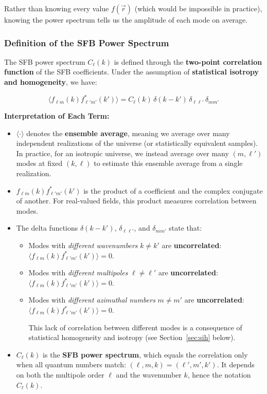 Rather than knowing every value $f(\vec{r})$ (which would be impossible in practice), knowing the power spectrum tells us the amplitude of each mode on average.

\subsubsection{Definition of the SFB Power Spectrum}

The SFB power spectrum $C_\ell(k)$ is defined through the \textbf{two-point correlation function} of the SFB coefficients. Under the assumption of \textbf{statistical isotropy and homogeneity}, we have:

\begin{equation}
\langle f_{\ell m}(k) f_{\ell' m'}^*(k') \rangle = C_\ell(k) \, \delta(k - k') \, \delta_{\ell \ell'} \, \delta_{m m'}
\label{eq:sfb_ps_definition}
\end{equation}

\textbf{Interpretation of Each Term:}

\begin{itemize}
    \item $\langle \cdot \rangle$ denotes the \textbf{ensemble average}, meaning we average over many independent realizations of the universe (or statistically equivalent samples). In practice, for an isotropic universe, we instead average over many $(m, \ell')$ modes at fixed $(k, \ell)$ to estimate this ensemble average from a single realization.
    
    \item $f_{\ell m}(k) f_{\ell' m'}^*(k')$ is the product of a coefficient and the complex conjugate of another. For real-valued fields, this product measures correlation between modes.
    
    \item The delta functions $\delta(k - k')$, $\delta_{\ell \ell'}$, and $\delta_{m m'}$ state that:
    \begin{itemize}
        \item Modes with \emph{different wavenumbers} $k \neq k'$ are \textbf{uncorrelated}: $\langle f_{\ell m}(k) f_{\ell' m'}^*(k') \rangle = 0$.
        \item Modes with \emph{different multipoles} $\ell \neq \ell'$ are \textbf{uncorrelated}: $\langle f_{\ell m}(k) f_{\ell' m'}^*(k') \rangle = 0$.
        \item Modes with \emph{different azimuthal numbers} $m \neq m'$ are \textbf{uncorrelated}: $\langle f_{\ell m}(k) f_{\ell' m'}^*(k') \rangle = 0$.
        
        This lack of correlation between different modes is a consequence of statistical homogeneity and isotropy (see Section~\ref{sec:sih} below).
    \end{itemize}
    
    \item $C_\ell(k)$ is the \textbf{SFB power spectrum}, which equals the correlation only when all quantum numbers match: $(\ell, m, k) = (\ell', m', k')$. It depends on both the multipole order $\ell$ and the wavenumber $k$, hence the notation $C_\ell(k)$.
\end{itemize}

